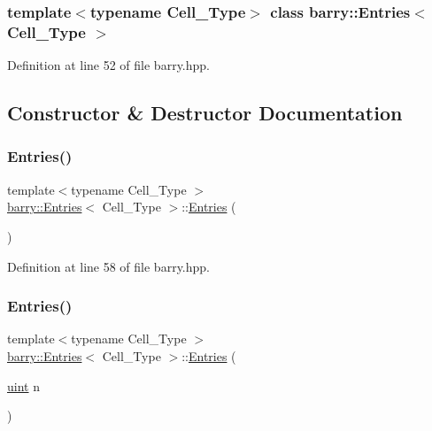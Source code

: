 \subsubsection*{template$<$typename Cell\+\_\+\+Type$>$\newline
class barry\+::\+Entries$<$ Cell\+\_\+\+Type $>$}



Definition at line 52 of file barry.\+hpp.



\subsection{Constructor \& Destructor Documentation}
\mbox{\label{classbarry_1_1_entries_aa51d37ad8e5f441fd64c954dfab9ad04}} 
\subsubsection{\texorpdfstring{Entries()}{Entries()}\hspace{0.1cm}{\footnotesize\ttfamily [1/2]}}
{\footnotesize\ttfamily template$<$typename Cell\+\_\+\+Type $>$ \\
\hyperlink{classbarry_1_1_entries}{barry\+::\+Entries}$<$ Cell\+\_\+\+Type $>$\+::\hyperlink{classbarry_1_1_entries}{Entries} (\begin{DoxyParamCaption}{ }\end{DoxyParamCaption})\hspace{0.3cm}{\ttfamily [inline]}}



Definition at line 58 of file barry.\+hpp.

\mbox{\label{classbarry_1_1_entries_a22dda1d0afd4fbe4b658e55ca1b61f16}} 
\subsubsection{\texorpdfstring{Entries()}{Entries()}\hspace{0.1cm}{\footnotesize\ttfamily [2/2]}}
{\footnotesize\ttfamily template$<$typename Cell\+\_\+\+Type $>$ \\
\hyperlink{classbarry_1_1_entries}{barry\+::\+Entries}$<$ Cell\+\_\+\+Type $>$\+::\hyperlink{classbarry_1_1_entries}{Entries} (\begin{DoxyParamCaption}\item[{\hyperlink{namespacebarry_a11dfc53ddb4672278319aa04f1e09a6c}{uint}}]{n }\end{DoxyParamCaption})\hspace{0.3cm}{\ttfamily [inline]}}



